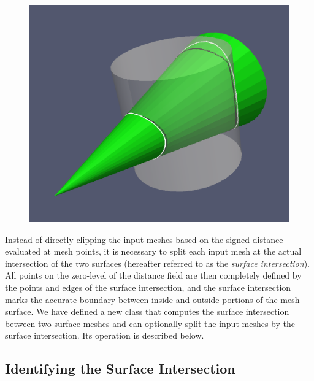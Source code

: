 \documentclass{InsightArticle}
\begin{document}
\begin{figure}[t]
\centering
\includegraphics[scale=0.25]{Figures/DistanceZeroLevelVsIntersection}
\label{fig:DistanceZeroLevelVsIntersection}
\end{figure}

Instead of directly clipping the input meshes based on the signed distance evaluated at mesh points, it is necessary to split each input mesh at the actual intersection of the two surfaces (hereafter referred to as the \emph{surface intersection}). All points on the zero-level of the distance field are then completely defined by the points and edges of the surface intersection, and the surface intersection marks the accurate boundary between inside and outside portions of the mesh surface. We have defined a new class  that computes the surface intersection between two surface meshes and can optionally split the input meshes by the surface intersection. Its operation is described below.

\subsection{Identifying the Surface Intersection}
\end{document}
